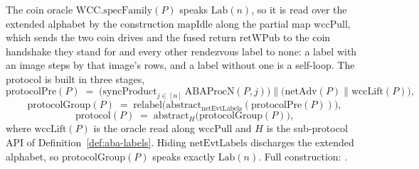 \begin{definition}
  \label{def:aba-protocol}
  \leanok
  The coin oracle $\mathrm{WCC.specFamily}(P)$ speaks $\mathrm{Lab}(n)$, so it is read over the extended alphabet by the construction $\mathrm{mapIdle}$ along the partial map $\mathrm{wccPull}$, which sends the two coin drives and the fused return $\mathrm{retWPub}$ to the coin handshake they stand for and every other rendezvous label to none: a label with an image steps by that image's rows, and a label without one is a self-loop.
  The protocol is built in three stages,
  \[
    \mathrm{protocolPre}(P) \;=\;
      \bigl(\mathrm{syncProduct}_{j \in [n]}\ \mathrm{ABAProcN}(P,j)\bigr)
        \parallel \bigl(\mathrm{netAdv}(P) \parallel \mathrm{wccLift}(P)\bigr),
  \]
  \[
    \mathrm{protocolGroup}(P) \;=\;
      \mathrm{relabel}\bigl(
        \mathrm{abstract}_{\mathrm{netEvtLabels}}(\mathrm{protocolPre}(P))\bigr),
  \]
  \[
    \mathrm{protocol}(P) \;=\; \mathrm{abstract}_H\bigl(\mathrm{protocolGroup}(P)\bigr),
  \]
  where $\mathrm{wccLift}(P)$ is the oracle read along $\mathrm{wccPull}$ and $H$ is the sub-protocol API of Definition~\ref{def:aba-labels}.
  Hiding $\mathrm{netEvtLabels}$ discharges the extended alphabet, so $\mathrm{protocolGroup}(P)$ speaks exactly $\mathrm{Lab}(n)$.
  Full construction: .
\end{definition}
